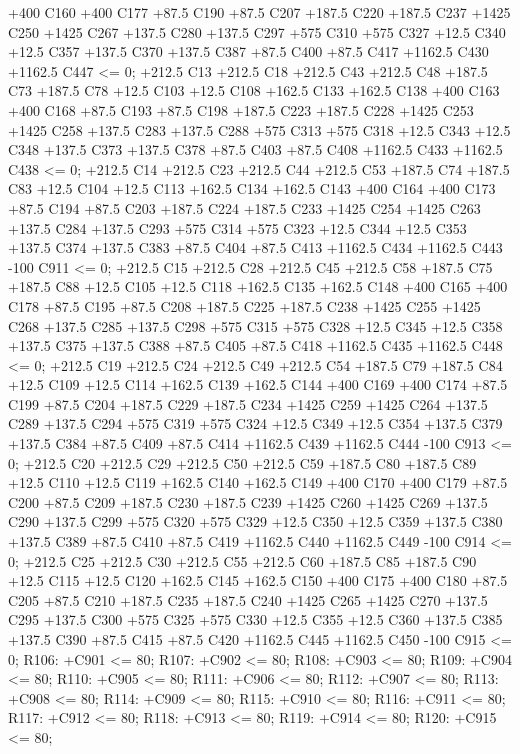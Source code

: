  +400 C160 +400 C177 +87.5 C190 +87.5 C207 +187.5 C220 +187.5 C237 +1425 C250 +1425 C267 +137.5 C280
 +137.5 C297 +575 C310 +575 C327 +12.5 C340 +12.5 C357 +137.5 C370 +137.5 C387 +87.5 C400 +87.5 C417
 +1162.5 C430 +1162.5 C447 <= 0;
+212.5 C13 +212.5 C18 +212.5 C43 +212.5 C48 +187.5 C73 +187.5 C78 +12.5 C103 +12.5 C108 +162.5 C133 +162.5 C138
 +400 C163 +400 C168 +87.5 C193 +87.5 C198 +187.5 C223 +187.5 C228 +1425 C253 +1425 C258 +137.5 C283
 +137.5 C288 +575 C313 +575 C318 +12.5 C343 +12.5 C348 +137.5 C373 +137.5 C378 +87.5 C403 +87.5 C408
 +1162.5 C433 +1162.5 C438 <= 0;
+212.5 C14 +212.5 C23 +212.5 C44 +212.5 C53 +187.5 C74 +187.5 C83 +12.5 C104 +12.5 C113 +162.5 C134 +162.5 C143
 +400 C164 +400 C173 +87.5 C194 +87.5 C203 +187.5 C224 +187.5 C233 +1425 C254 +1425 C263 +137.5 C284
 +137.5 C293 +575 C314 +575 C323 +12.5 C344 +12.5 C353 +137.5 C374 +137.5 C383 +87.5 C404 +87.5 C413
 +1162.5 C434 +1162.5 C443 -100 C911 <= 0;
+212.5 C15 +212.5 C28 +212.5 C45 +212.5 C58 +187.5 C75 +187.5 C88 +12.5 C105 +12.5 C118 +162.5 C135 +162.5 C148
 +400 C165 +400 C178 +87.5 C195 +87.5 C208 +187.5 C225 +187.5 C238 +1425 C255 +1425 C268 +137.5 C285
 +137.5 C298 +575 C315 +575 C328 +12.5 C345 +12.5 C358 +137.5 C375 +137.5 C388 +87.5 C405 +87.5 C418
 +1162.5 C435 +1162.5 C448 <= 0;
+212.5 C19 +212.5 C24 +212.5 C49 +212.5 C54 +187.5 C79 +187.5 C84 +12.5 C109 +12.5 C114 +162.5 C139 +162.5 C144
 +400 C169 +400 C174 +87.5 C199 +87.5 C204 +187.5 C229 +187.5 C234 +1425 C259 +1425 C264 +137.5 C289
 +137.5 C294 +575 C319 +575 C324 +12.5 C349 +12.5 C354 +137.5 C379 +137.5 C384 +87.5 C409 +87.5 C414
 +1162.5 C439 +1162.5 C444 -100 C913 <= 0;
+212.5 C20 +212.5 C29 +212.5 C50 +212.5 C59 +187.5 C80 +187.5 C89 +12.5 C110 +12.5 C119 +162.5 C140 +162.5 C149
 +400 C170 +400 C179 +87.5 C200 +87.5 C209 +187.5 C230 +187.5 C239 +1425 C260 +1425 C269 +137.5 C290
 +137.5 C299 +575 C320 +575 C329 +12.5 C350 +12.5 C359 +137.5 C380 +137.5 C389 +87.5 C410 +87.5 C419
 +1162.5 C440 +1162.5 C449 -100 C914 <= 0;
+212.5 C25 +212.5 C30 +212.5 C55 +212.5 C60 +187.5 C85 +187.5 C90 +12.5 C115 +12.5 C120 +162.5 C145 +162.5 C150
 +400 C175 +400 C180 +87.5 C205 +87.5 C210 +187.5 C235 +187.5 C240 +1425 C265 +1425 C270 +137.5 C295
 +137.5 C300 +575 C325 +575 C330 +12.5 C355 +12.5 C360 +137.5 C385 +137.5 C390 +87.5 C415 +87.5 C420
 +1162.5 C445 +1162.5 C450 -100 C915 <= 0;
R106: +C901 <= 80;
R107: +C902 <= 80;
R108: +C903 <= 80;
R109: +C904 <= 80;
R110: +C905 <= 80;
R111: +C906 <= 80;
R112: +C907 <= 80;
R113: +C908 <= 80;
R114: +C909 <= 80;
R115: +C910 <= 80;
R116: +C911 <= 80;
R117: +C912 <= 80;
R118: +C913 <= 80;
R119: +C914 <= 80;
R120: +C915 <= 80; \\

